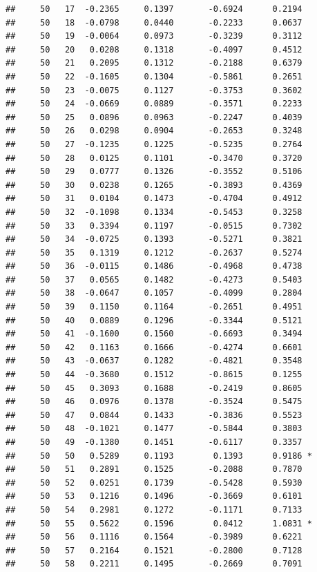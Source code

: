 \documentclass[
]{article}
\begin{document}
\begin{verbatim}
##     50   17  -0.2365     0.1397       -0.6924      0.2194  
##     50   18  -0.0798     0.0440       -0.2233      0.0637  
##     50   19  -0.0064     0.0973       -0.3239      0.3112  
##     50   20   0.0208     0.1318       -0.4097      0.4512  
##     50   21   0.2095     0.1312       -0.2188      0.6379  
##     50   22  -0.1605     0.1304       -0.5861      0.2651  
##     50   23  -0.0075     0.1127       -0.3753      0.3602  
##     50   24  -0.0669     0.0889       -0.3571      0.2233  
##     50   25   0.0896     0.0963       -0.2247      0.4039  
##     50   26   0.0298     0.0904       -0.2653      0.3248  
##     50   27  -0.1235     0.1225       -0.5235      0.2764  
##     50   28   0.0125     0.1101       -0.3470      0.3720  
##     50   29   0.0777     0.1326       -0.3552      0.5106  
##     50   30   0.0238     0.1265       -0.3893      0.4369  
##     50   31   0.0104     0.1473       -0.4704      0.4912  
##     50   32  -0.1098     0.1334       -0.5453      0.3258  
##     50   33   0.3394     0.1197       -0.0515      0.7302  
##     50   34  -0.0725     0.1393       -0.5271      0.3821  
##     50   35   0.1319     0.1212       -0.2637      0.5274  
##     50   36  -0.0115     0.1486       -0.4968      0.4738  
##     50   37   0.0565     0.1482       -0.4273      0.5403  
##     50   38  -0.0647     0.1057       -0.4099      0.2804  
##     50   39   0.1150     0.1164       -0.2651      0.4951  
##     50   40   0.0889     0.1296       -0.3344      0.5121  
##     50   41  -0.1600     0.1560       -0.6693      0.3494  
##     50   42   0.1163     0.1666       -0.4274      0.6601  
##     50   43  -0.0637     0.1282       -0.4821      0.3548  
##     50   44  -0.3680     0.1512       -0.8615      0.1255  
##     50   45   0.3093     0.1688       -0.2419      0.8605  
##     50   46   0.0976     0.1378       -0.3524      0.5475  
##     50   47   0.0844     0.1433       -0.3836      0.5523  
##     50   48  -0.1021     0.1477       -0.5844      0.3803  
##     50   49  -0.1380     0.1451       -0.6117      0.3357  
##     50   50   0.5289     0.1193        0.1393      0.9186 *
##     50   51   0.2891     0.1525       -0.2088      0.7870  
##     50   52   0.0251     0.1739       -0.5428      0.5930  
##     50   53   0.1216     0.1496       -0.3669      0.6101  
##     50   54   0.2981     0.1272       -0.1171      0.7133  
##     50   55   0.5622     0.1596        0.0412      1.0831 *
##     50   56   0.1116     0.1564       -0.3989      0.6221  
##     50   57   0.2164     0.1521       -0.2800      0.7128  
##     50   58   0.2211     0.1495       -0.2669      0.7091  

\end{verbatim}
\end{document}
